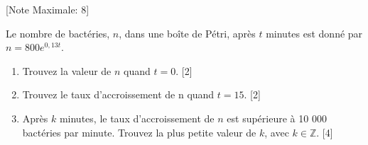 \begin{question}
  \hspace*{\fill} [Note Maximale: 8]\par
  \medskip
  \noindent Le nombre de bactéries, $n$, dans une boîte de Pétri, après $t$ minutes est donné par $n = 800e^{0,13t}$. \par
  \medskip
  \begin{enumerate}[label=(\alph*)]
    \item Trouvez la valeur de $n$ quand $t = 0$.\hspace*{\fill} [2]
    \item Trouvez le taux d'accroissement de n quand $t = 15$.\hspace*{\fill} [2]
    \item Après $k$ minutes, le taux d'accroissement de $n$ est supérieure à 10 000 bactéries par minute.  Trouvez la plus petite valeur de $k$, avec $k \in \mathbb{Z}$.\hspace*{\fill} [4]
  \end{enumerate}
\end{question}

